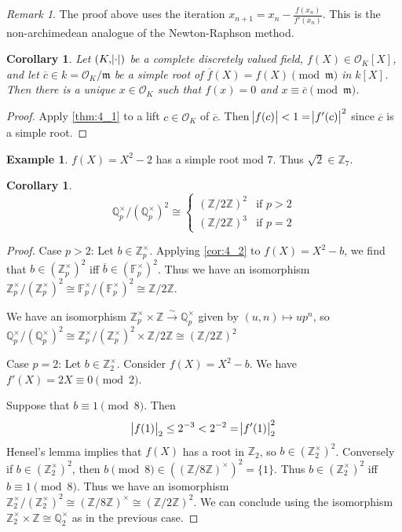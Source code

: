 \documentclass[11pt]{article}
\theoremstyle{definition}
\newtheorem*{example}{Example}
\theoremstyle{plain}
\newtheorem{corollary}[definition]{Corollary}
\theoremstyle{remark}
\newtheorem*{remark}{Remark}
\newcommand{\FF}{\mathbb{F}}
\newcommand{\ZZ}{\mathbb{Z}}
\newcommand{\QQ}{\mathbb{Q}}
\newcommand{\cO}{\mathcal{O}}
\newcommand{\fm}{\mathfrak{m}}
\begin{document}
\begin{remark}
    The proof above uses the iteration $x_{n+1} = x_n - \frac{f(x_n)}{f'(x_n)}$. This is the non-archimedean analogue of the Newton-Raphson method.
\end{remark}

\begin{corollary}\label{cor:4_2}
    Let $(K, \abs{\cdot})$ be a complete discretely valued field, $f(X) \in \cO_K[X]$, and let $\overline{c} \in k = \cO_K / \fm$ be a simple root of $\overline{f}(X) = f(X) \pmod{\fm}$ in $k[X]$. Then there is a unique $x \in \cO_K$ such that $f(x) = 0$ and $x \equiv \overline{c} \pmod{\fm}$.
\end{corollary}
\begin{proof}
    Apply \autoref{thm:4_1} to a lift $c \in \cO_K$ of $\overline{c}$. Then $\abs{f(c)} < 1 = \abs{f'(c)}^2$ since $\overline{c}$ is a simple root.
\end{proof}

\begin{example}
    $f(X) = X^2 - 2$ has a simple root mod $7$. Thus $\sqrt{2} \in \ZZ_7$.
\end{example}

\begin{corollary}\label{cor:4_3}
    \begin{equation*}
        \QQ_p^\times / (\QQ_p^\times)^2 \cong
        \begin{cases}
            (\ZZ / 2 \ZZ)^2 & \text{if } p > 2\\
            (\ZZ / 2 \ZZ)^3 & \text{if } p = 2
        \end{cases}
    \end{equation*}
\end{corollary}
\begin{proof}
    Case $p > 2$: Let $b \in \ZZ_p^\times$. Applying \autoref{cor:4_2} to $f(X) = X^2 - b$, we find that $b \in (\ZZ_p^\times)^2$ iff $\overline{b} \in (\FF_p^\times)^2$. Thus we have an isomorphism $\ZZ_p^\times / (\ZZ_p^\times)^2 \cong \FF_p^\times / (\FF_p^\times)^2 \cong \ZZ / 2\ZZ$.

    We have an isomorphism $\ZZ_p^\times \times \ZZ \xrightarrow{\sim} \QQ_p^\times$ given by $(u, n) \mapsto u p^n$, so $\QQ_p^\times / (\QQ_p^\times)^2 \cong \ZZ_p^\times / (\ZZ_p^\times)^2 \times \ZZ / 2\ZZ \cong (\ZZ / 2\ZZ)^2$

    Case $p = 2$: Let $b \in \ZZ_2^\times$. Consider $f(X) = X^2 - b$. We have $f'(X) = 2X \equiv 0 \pmod{2}$.

    Suppose that $b \equiv 1 \pmod{8}$. Then
    \begin{equation*}
        \abs{f(1)}_2 \le 2^{-3} < 2^{-2} = \abs{f'(1)}_2^2
    \end{equation*}
    Hensel's lemma implies that $f(X)$ has a root in $\ZZ_2$, so $b \in (\ZZ_2^\times)^2$. Conversely if $b \in (\ZZ_2^\times)^2$, then $b \pmod{8} \in ((\ZZ / 8\ZZ)^\times)^2 = \{1\}$. Thus $b \in (\ZZ_2^\times)^2$ iff $b \equiv 1 \pmod{8}$. Thus we have an isomorphism $\ZZ_2^\times / (\ZZ_2^\times)^2 \cong (\ZZ / 8 \ZZ)^\times \cong (\ZZ / 2\ZZ)^2$. We can conclude using the isomorphism $\ZZ_2^\times \times \ZZ \cong \QQ_2^\times$ as in the previous case.
\end{proof}
\end{document}
